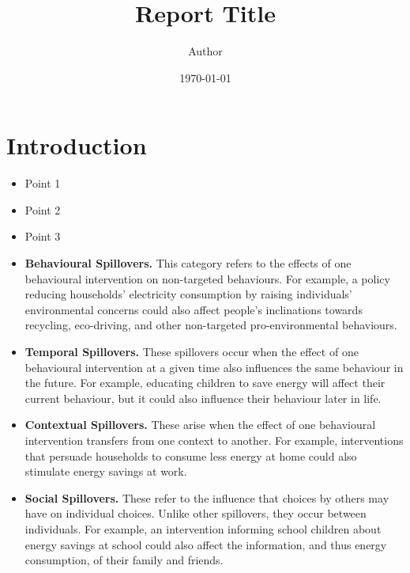 \documentclass{article}
\title{\textbf{\LARGE Report Title}}
\author{\Large Author}
\date{\Large \today}
\begin{document}
 
\section{Introduction}
\begin{keypoints}
\begin{itemize}
  \item Point 1
  \item Point 2
  \item Point 3
\end{itemize}
\end{keypoints}

\lipsum[1] %


\begin{mybox}
    \lipsum[1] %
\end{mybox}

\begin{mybox}
    \begin{itemize}
        \item \textbf{Behavioural Spillovers.} This category refers to the effects of one behavioural intervention on non-targeted behaviours. For example, a policy reducing households' electricity consumption by raising individuals' environmental concerns could also affect people's inclinations towards recycling, eco-driving, and other non-targeted pro-environmental behaviours.
        
        \item \textbf{Temporal Spillovers.} These spillovers occur when the effect of one behavioural intervention at a given time also influences the same behaviour in the future. For example, educating children to save energy will affect their current behaviour, but it could also influence their behaviour later in life.
        
        \item \textbf{Contextual Spillovers.} These arise when the effect of one behavioural intervention transfers from one context to another. For example, interventions that persuade households to consume less energy at home could also stimulate energy savings at work.
        
        \item \textbf{Social Spillovers.} These refer to the influence that choices by others may have on individual choices. Unlike other spillovers, they occur between individuals. For example, an intervention informing school children about energy savings at school could also affect the information, and thus energy consumption, of their family and friends.
      \end{itemize}
\end{mybox}
\end{document}
